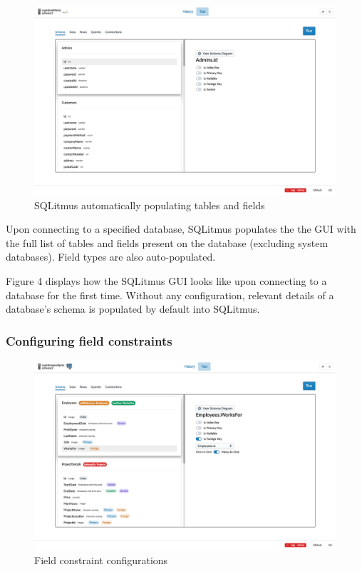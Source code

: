 \documentclass[12pt]{article}
\begin{document}
\begin{spacing}{1.9}
		
		\begin{figure}[H]
			\centering
			\includegraphics[width=\textwidth]{3-2.png}
			\caption{SQLitmus automatically populating tables and fields}
			
		\end{figure}
		
		Upon connecting to a specified database, SQLitmus populates the the GUI with the full list of tables and fields present on the database (excluding system databases). Field types are also auto-populated.
		
		Figure 4 displays how the SQLitmus GUI looks like upon connecting to a database for the first time. Without any configuration, relevant details of a database's schema is populated by default into SQLitmus.
		
		\subsubsection{ Configuring field constraints}
		
		
		\begin{figure}[H]
			\centering
			\includegraphics[width=\textwidth]{3-2-1.png}
			\caption{Field constraint configurations }
			

\end{figure}
\end{spacing}
\end{document}

